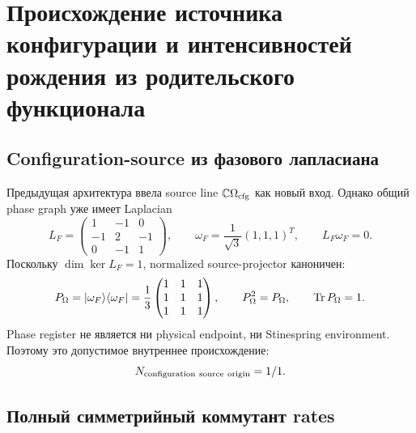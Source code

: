 \chapter{Происхождение источника конфигурации и интенсивностей рождения из родительского функционала}
\label{ch:v9-endpoint-creation-parent-origin}

\section{Configuration-source из фазового лапласиана}

Предыдущая архитектура ввела source line $\mathbb C\Omega_{\rm cfg}$ как
новый вход. Однако общий phase graph уже имеет Laplacian
\begin{equation}
 L_F=\begin{pmatrix}1&-1&0\\-1&2&-1\\0&-1&1\end{pmatrix},
 \qquad
 \omega_F=\frac1{\sqrt3}(1,1,1)^T,
 \qquad L_F\omega_F=0.
 \label{eq:v9-creation-origin-phase-zero-mode}
\end{equation}
Поскольку $\dim\ker L_F=1$, normalized source-projector каноничен:
\begin{equation}
 P_\Omega=|\omega_F\rangle\langle\omega_F|
 =\frac13\begin{pmatrix}1&1&1\\1&1&1\\1&1&1\end{pmatrix},
 \qquad P_\Omega^2=P_\Omega,
 \qquad \operatorname{Tr} P_\Omega=1.
 \label{eq:v9-creation-origin-source-projector}
\end{equation}
Phase register не является ни physical endpoint, ни Stinespring
environment. Поэтому это допустимое внутреннее происхождение:
\begin{equation}
 N_{\rm configuration\ source\ origin}=1/1.
 \label{eq:v9-creation-origin-source-ledger}
\end{equation}

\section{Полный симметрийный коммутант rates}

